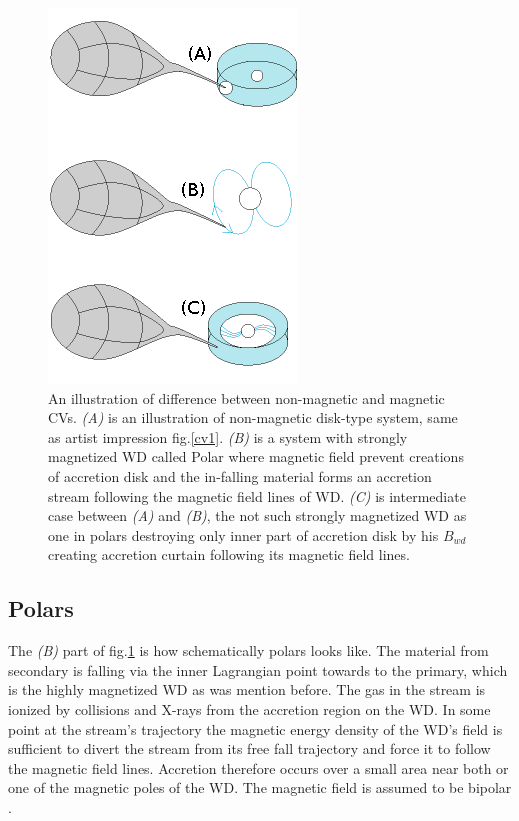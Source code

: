 \documentclass[oneside,a4paper,11pt]{report}
\begin{document}
\begin{figure}[hbt!]
\centering
\includegraphics[totalheight=5cm]{plot/binall}
\caption{An illustration of difference between non-magnetic and magnetic CVs. \textit{(A)} is an illustration of non-magnetic 
disk-type system, same as artist impression fig.\ref{cv1}. \textit{(B)} is a system with strongly magnetized WD called Polar 
where magnetic field prevent creations of accretion disk and the in-falling material forms an accretion stream following the 
magnetic field lines of WD.
\textit{(C)} is intermediate case between \textit{(A)} and \textit{(B)}, the not such strongly magnetized WD as one in polars 
destroying only inner part of accretion disk by his $B_{wd}$ creating accretion curtain following its magnetic field lines. }
\label{all_typescv} 
\end{figure}

\subsection{Polars}
The \textit{(B)} part of fig.\ref{all_typescv} is how schematically polars looks like. The material from secondary is falling via 
the inner Lagrangian point towards to the primary, which is the highly magnetized WD as was mention before. The gas in the
 stream is ionized by collisions and X-rays from the accretion region on the WD. In some point at the stream's trajectory 
the magnetic energy density of the WD's field is sufficient to divert the stream from its free fall trajectory and force 
it to follow the magnetic field lines. Accretion therefore occurs over a small area near both or one of the magnetic poles 
of the WD. The magnetic field is assumed to be bipolar \citet{1990SSRv...54..195C}.
\end{document}
